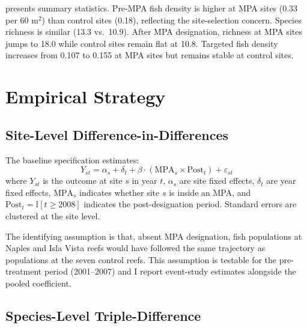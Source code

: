 \documentclass[12pt]{article}
\newcommand{\ind}{\mathbb{I}}
\begin{document}


 presents summary statistics. Pre-MPA fish density is higher at MPA sites (0.33 per 60 m$^2$) than control sites (0.18), reflecting the site-selection concern. Species richness is similar (13.3 vs.\ 10.9). After MPA designation, richness at MPA sites jumps to 18.0 while control sites remain flat at 10.8. Targeted fish density increases from 0.107 to 0.155 at MPA sites but remains stable at control sites.


\section{Empirical Strategy}
\label{sec:strategy}

\subsection{Site-Level Difference-in-Differences}

The baseline specification estimates:
\begin{equation}
\label{eq:did}
Y_{st} = \alpha_s + \delta_t + \beta \cdot (\text{MPA}_s \times \text{Post}_t) + \varepsilon_{st}
\end{equation}
where $Y_{st}$ is the outcome at site $s$ in year $t$, $\alpha_s$ are site fixed effects, $\delta_t$ are year fixed effects, $\text{MPA}_s$ indicates whether site $s$ is inside an MPA, and $\text{Post}_t = \ind[t \geq 2008]$ indicates the post-designation period. Standard errors are clustered at the site level.

The identifying assumption is that, absent MPA designation, fish populations at Naples and Isla Vista reefs would have followed the same trajectory as populations at the seven control reefs. This assumption is testable for the pre-treatment period (2001--2007) and I report event-study estimates alongside the pooled coefficient.

\subsection{Species-Level Triple-Difference}
\end{document}
